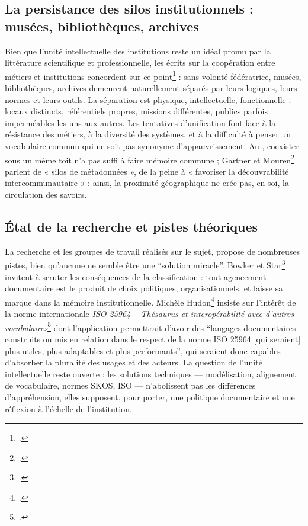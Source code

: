 \subsection{La persistance des silos institutionnels : musées, bibliothèques, archives}

Bien que l'unité intellectuelle des institutions reste un idéal promu par la littérature scientifique et professionnelle, les écrits sur la coopération entre métiers et institutions concordent sur ce point\footcite{gartnerArchivesMuseumsLibraries2019,rossini-paquetBibliothequesMuseesQuellesa,yarrowBibliothequesPubliquesArchives2008a} : sans volonté fédératrice, musées, bibliothèques, archives demeurent naturellement séparés par leurs logiques, leurs normes et leurs outils. La séparation est physique, intellectuelle, fonctionnelle : locaux distincts, référentiels propres, missions différentes, publics parfois imperméables les uns aux autres. Les tentatives d’unification font face à la résistance des métiers, à la diversité des systèmes, et à la difficulté à penser un vocabulaire commun qui ne soit pas synonyme d’appauvrissement. Au \mae, coexister sous un même toit n’a pas suffi à faire mémoire commune ; Gartner et Mouren\footcite{gartnerArchivesMuseumsLibraries2019} parlent de « silos de métadonnées », de la peine à « favoriser la découvrabilité intercommunautaire » : ainsi, la proximité géographique ne crée pas, en soi, la circulation des savoirs.

\subsection{État de la recherche et pistes théoriques}

La recherche et les groupes de travail réalisés sur le sujet, propose de nombreuses pistes, bien qu'aucune ne semble être une \enquote{solution miracle}. Bowker et Star\footcite{bowkerArrangerChosesConsequences2023} invitent à scruter les conséquences de la classification : tout agencement documentaire est le produit de choix politiques, organisationnels, et laisse sa marque dans la mémoire institutionnelle. Michèle Hudon\footcite{hudonISO25964Pour2012a} insiste sur l'intérêt de la norme internationale \textit{ISO 25964 -- Thésaurus et interopérabilité avec d'autres vocabulaires}\footcite{ISO25964120112011} dont l'application permettrait d'avoir des \enquote{langages documentaires construits ou mis en relation dans le respect de la norme ISO 25964 [qui seraient] plus utiles, plus adaptables et plus performants}, qui seraient donc capables d’absorber la pluralité des usages et des acteurs. La question de l’unité intellectuelle reste ouverte : les solutions techniques — modélisation, alignement de vocabulaire, normes SKOS, ISO — n’abolissent pas les différences d’appréhension, elles supposent, pour porter, une politique documentaire et une réflexion à l'échelle de l'institution.

